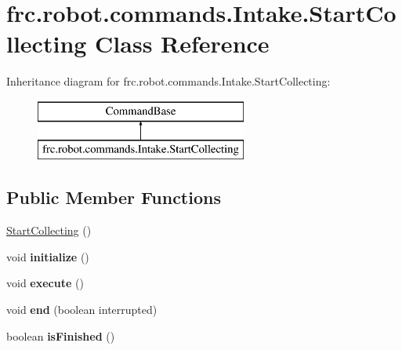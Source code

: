 \hypertarget{classfrc_1_1robot_1_1commands_1_1_intake_1_1_start_collecting}{}\section{frc.\+robot.\+commands.\+Intake.\+Start\+Collecting Class Reference}
\label{classfrc_1_1robot_1_1commands_1_1_intake_1_1_start_collecting}
Inheritance diagram for frc.\+robot.\+commands.\+Intake.\+Start\+Collecting\+:\begin{figure}[H]
\begin{center}
\leavevmode
\includegraphics[height=2.000000cm]{classfrc_1_1robot_1_1commands_1_1_intake_1_1_start_collecting}
\end{center}
\end{figure}
\subsection*{Public Member Functions}
\begin{DoxyCompactItemize}
\item 
\mbox{\hyperlink{classfrc_1_1robot_1_1commands_1_1_intake_1_1_start_collecting_ab11c6e2edcad126246d41a0f09ee2461}{Start\+Collecting}} ()
\item 
\mbox{\label{classfrc_1_1robot_1_1commands_1_1_intake_1_1_start_collecting_a00b2ab4e96a8ca22fe4f1a685d5f42ee}} 
void {\bfseries initialize} ()
\item 
\mbox{\label{classfrc_1_1robot_1_1commands_1_1_intake_1_1_start_collecting_a973fedb2ff1dd5d0e91b19035e91bfdd}} 
void {\bfseries execute} ()
\item 
\mbox{\label{classfrc_1_1robot_1_1commands_1_1_intake_1_1_start_collecting_a55625912f18cee89849b171621c2e002}} 
void {\bfseries end} (boolean interrupted)
\item 
\mbox{\label{classfrc_1_1robot_1_1commands_1_1_intake_1_1_start_collecting_a9f1b97e3071827589731f5d05b9e2501}} 
boolean {\bfseries is\+Finished} ()
\end{DoxyCompactItemize}


